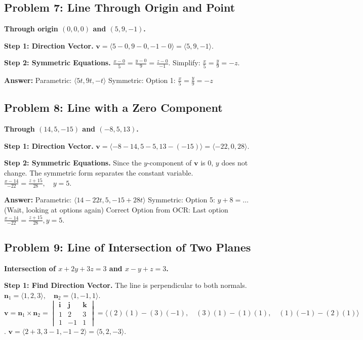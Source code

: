 \documentclass[11pt]{article}
\begin{document}
\hrulefill

\subsection*{Problem 7: Line Through Origin and Point}
\textbf{Through origin $(0,0,0)$ and $(5, 9, -1)$.}

\textbf{Step 1: Direction Vector.}
$\mathbf{v} = \langle 5-0, 9-0, -1-0 \rangle = \langle 5, 9, -1 \rangle$.

\textbf{Step 2: Symmetric Equations.}
$\frac{x-0}{5} = \frac{y-0}{9} = \frac{z-0}{-1}$.
Simplify: $\frac{x}{5} = \frac{y}{9} = -z$.

\textbf{Answer:}
Parametric: $\langle 5t, 9t, -t \rangle$
Symmetric: Option 1: $\frac{x}{5} = \frac{y}{9} = -z$

\hrulefill

\subsection*{Problem 8: Line with a Zero Component}
\textbf{Through $(14, 5, -15)$ and $(-8, 5, 13)$.}

\textbf{Step 1: Direction Vector.}
$\mathbf{v} = \langle -8-14, 5-5, 13-(-15) \rangle = \langle -22, 0, 28 \rangle$.

\textbf{Step 2: Symmetric Equations.}
Since the $y$-component of $\mathbf{v}$ is 0, $y$ does not change. The symmetric form separates the constant variable.
$\frac{x-14}{-22} = \frac{z+15}{28}, \quad y = 5$.

\textbf{Answer:}
Parametric: $\langle 14-22t, 5, -15+28t \rangle$
Symmetric: Option 5: $y+8 = \dots$ (Wait, looking at options again)
Correct Option from OCR: Last option $\frac{x-14}{-22} = \frac{z+15}{28}, y=5$.

\hrulefill

\subsection*{Problem 9: Line of Intersection of Two Planes}
\textbf{Intersection of $x + 2y + 3z = 3$ and $x - y + z = 3$.}

\textbf{Step 1: Find Direction Vector.}
The line is perpendicular to both normals.
$\mathbf{n}_1 = \langle 1, 2, 3 \rangle, \quad \mathbf{n}_2 = \langle 1, -1, 1 \rangle$.
$\mathbf{v} = \mathbf{n}_1 \times \mathbf{n}_2 = \begin{vmatrix} \mathbf{i} & \mathbf{j} & \mathbf{k} \\ 1 & 2 & 3 \\ 1 & -1 & 1 \end{vmatrix} = \langle (2)(1) - (3)(-1), \quad (3)(1) - (1)(1), \quad (1)(-1) - (2)(1) \rangle$.
$\mathbf{v} = \langle 2+3, 3-1, -1-2 \rangle = \langle 5, 2, -3 \rangle$.
\end{document}
